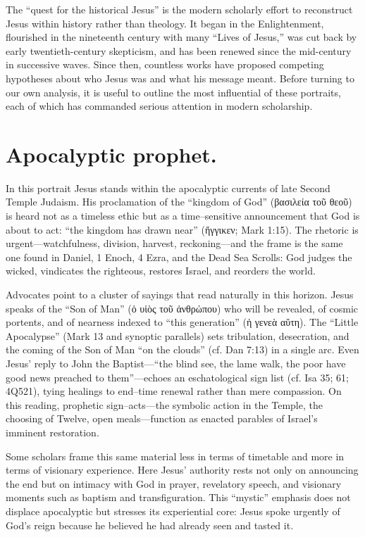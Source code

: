 The “quest for the historical Jesus” is the modern scholarly effort to reconstruct Jesus within history rather than theology.
It began in the Enlightenment, flourished in the nineteenth century with many “Lives of Jesus,” was cut back by early twentieth-century skepticism, and has been renewed since the mid-century in successive waves.
Since then, countless works have proposed competing hypotheses about who Jesus was and what his message meant.
Before turning to our own analysis, it is useful to outline the most influential of these portraits, each of which has commanded serious attention in modern scholarship.

\section{Apocalyptic prophet.}\label{sec:apocalyptic}

In this portrait Jesus stands within the apocalyptic currents of late Second Temple Judaism.
His proclamation of the “kingdom of God” (βασιλεία τοῦ θεοῦ) is heard not as a timeless ethic but as a time–sensitive announcement that God is about to act: “the kingdom has drawn near” (ἤγγικεν; Mark 1:15).
The rhetoric is urgent—watchfulness, division, harvest, reckoning—and the frame is the same one found in Daniel, 1 Enoch, 4 Ezra, and the Dead Sea Scrolls: God judges the wicked, vindicates the righteous, restores Israel, and reorders the world.

Advocates point to a cluster of sayings that read naturally in this horizon.
Jesus speaks of the “Son of Man” (ὁ υἱὸς τοῦ ἀνθρώπου) who will be revealed, of cosmic portents, and of nearness indexed to “this generation” (ἡ γενεὰ αὕτη).
The “Little Apocalypse” (Mark 13 and synoptic parallels) sets tribulation, desecration, and the coming of the Son of Man “on the clouds” (cf. Dan 7:13) in a single arc.
Even Jesus’ reply to John the Baptist—“the blind see, the lame walk, the poor have good news preached to them”—echoes an eschatological sign list (cf. Isa 35; 61; 4Q521), tying healings to end–time renewal rather than mere compassion.
On this reading, prophetic sign–acts—the symbolic action in the Temple, the choosing of Twelve, open meals—function as enacted parables of Israel’s imminent restoration.

Some scholars frame this same material less in terms of timetable and more in terms of visionary experience.
Here Jesus’ authority rests not only on announcing the end but on intimacy with God in prayer, revelatory speech, and visionary moments such as baptism and transfiguration.
This “mystic” emphasis does not displace apocalyptic but stresses its experiential core: Jesus spoke urgently of God’s reign because he believed he had already seen and tasted it.

